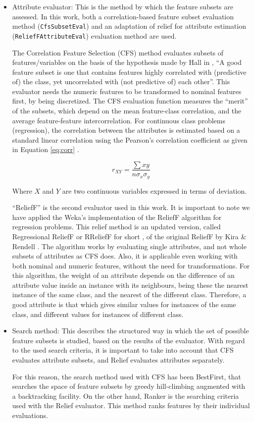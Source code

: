 \documentclass[a4paper,10pt,twocolumn,preprint,3p]{elsarticle}
\begin{document}
\begin{itemize}
  \item Attribute evaluator: This is the method by which the feature subsets are assessed. In this work, both a correlation-based feature subset evaluation method ({\tt CfsSubsetEval}) and an adaptation of relief for attribute estimation ({\tt ReliefFAttributeEval}) evaluation method are used. 
  
  The Correlation Feature Selection (CFS) method evaluates subsets of features/variables on the basis of the hypothesis made by Hall in \cite{Hall1998}, ``A good feature subset is one that  contains features highly correlated with
(predictive of) the class, yet uncorrelated with (not predictive of) each other''. This evaluator needs the numeric features to be transformed to nominal features first, by being discretized.
The CFS evaluation function measures the ``merit'' of the subsets, which depend on the mean feature-class correlation, and the average feature-feature intercorrelation. For continuous class problems (regression), the correlation between the attributes is estimated based on a standard linear correlation
using the Pearson's correlation coefficient as given in Equation \ref{eq:corr} \cite{hall2000correlation}. 

\begin{equation}
r_{XY}=\frac{\sum xy}{n\sigma_{x}\sigma_{y}}
\label{eq:corr}
\end{equation}


Where $X$ and $Y$ are two continuous variables expressed in terms
of deviation. 

``ReliefF'' is the second evaluator used in this work. It is important to note 
we have applied the Weka's implementation of the ReliefF algorithm for regression problems. This relief method is an updated version, called Regressional ReliefF or RReliefF for short \cite{RobnikSikonja1997}, of the original ReliefF by Kira \& Rendell \cite{Kira1992}. The algorithm works by evaluating single attributes, and not whole subsets of attributes as CFS does. Also, it is applicable even working with both nominal and numeric features, without the need for transformations. For this algorithm, the weight of an attribute depends on the difference of an attribute value inside an instance with its neighbours, being these the nearest instance of the same class, and the nearest of the different class. Therefore, a good attribute is that which gives similar values for instances of the same class, and different values for instances of different class.
 \item Search method: This describes the structured way in which the set of possible feature subsets is studied, based on the results of the evaluator. With regard to the used search criteria, it is important to take into account that CFS evaluates attribute subsets, and Relief evaluates attributes separately.

For this reason, the search method used with CFS has been BestFirst, that searches the space of feature subsets by greedy hill-climbing augmented with a backtracking facility. On the other hand, Ranker is the searching criteria used with the Relief evaluator. This method ranks features by their individual evaluations.
\end{itemize}
\end{document}
